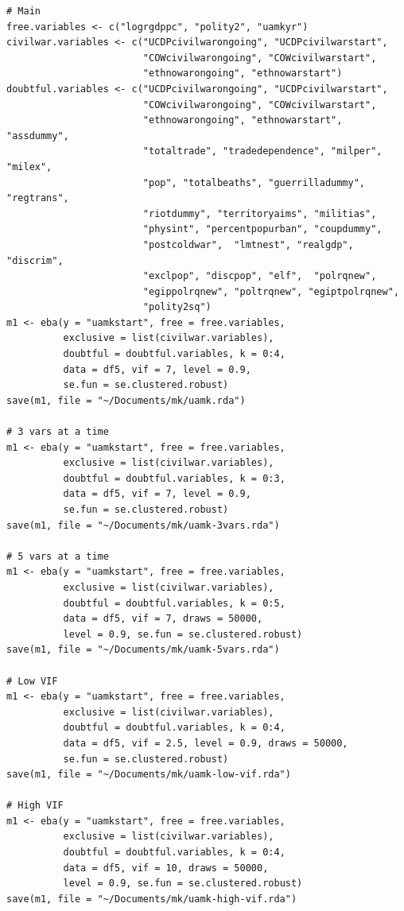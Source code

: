 \documentclass[a4paper,12pt]{article}
\begin{document}
\begin{verbatim}
# Main
free.variables <- c("logrgdppc", "polity2", "uamkyr")
civilwar.variables <- c("UCDPcivilwarongoing", "UCDPcivilwarstart",
                        "COWcivilwarongoing", "COWcivilwarstart",
                        "ethnowarongoing", "ethnowarstart")
doubtful.variables <- c("UCDPcivilwarongoing", "UCDPcivilwarstart",
                        "COWcivilwarongoing", "COWcivilwarstart",
                        "ethnowarongoing", "ethnowarstart", "assdummy",
                        "totaltrade", "tradedependence", "milper", "milex",
                        "pop", "totalbeaths", "guerrilladummy", "regtrans",
                        "riotdummy", "territoryaims", "militias",
                        "physint", "percentpopurban", "coupdummy",
                        "postcoldwar",  "lmtnest", "realgdp", "discrim",
                        "exclpop", "discpop", "elf",  "polrqnew",
                        "egippolrqnew", "poltrqnew", "egiptpolrqnew",
                        "polity2sq")
m1 <- eba(y = "uamkstart", free = free.variables,
          exclusive = list(civilwar.variables),
          doubtful = doubtful.variables, k = 0:4,
          data = df5, vif = 7, level = 0.9, 
          se.fun = se.clustered.robust)
save(m1, file = "~/Documents/mk/uamk.rda")

# 3 vars at a time
m1 <- eba(y = "uamkstart", free = free.variables,
          exclusive = list(civilwar.variables),
          doubtful = doubtful.variables, k = 0:3,
          data = df5, vif = 7, level = 0.9,
          se.fun = se.clustered.robust)
save(m1, file = "~/Documents/mk/uamk-3vars.rda")

# 5 vars at a time
m1 <- eba(y = "uamkstart", free = free.variables,
          exclusive = list(civilwar.variables),
          doubtful = doubtful.variables, k = 0:5,
          data = df5, vif = 7, draws = 50000,
          level = 0.9, se.fun = se.clustered.robust)
save(m1, file = "~/Documents/mk/uamk-5vars.rda")

# Low VIF
m1 <- eba(y = "uamkstart", free = free.variables,
          exclusive = list(civilwar.variables),
          doubtful = doubtful.variables, k = 0:4,
          data = df5, vif = 2.5, level = 0.9, draws = 50000,
          se.fun = se.clustered.robust)
save(m1, file = "~/Documents/mk/uamk-low-vif.rda")

# High VIF
m1 <- eba(y = "uamkstart", free = free.variables,
          exclusive = list(civilwar.variables),
          doubtful = doubtful.variables, k = 0:4,
          data = df5, vif = 10, draws = 50000,
          level = 0.9, se.fun = se.clustered.robust)
save(m1, file = "~/Documents/mk/uamk-high-vif.rda")


\end{verbatim}
\end{document}
